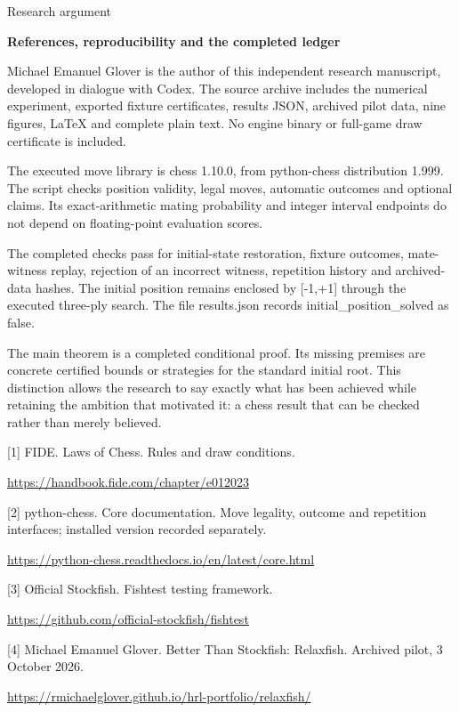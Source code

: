 \documentclass[10pt]{article}
\begin{document}
\clearpage
{\small\color{accent}Research argument}\par
{\LARGE\bfseries\color{ink}References, reproducibility and the completed ledger}\par\vspace{7pt}
Michael Emanuel Glover is the author of this independent research manuscript, developed in dialogue with Codex. The source archive includes the numerical experiment, exported fixture certificates, results JSON, archived pilot data, nine figures, LaTeX and complete plain text. No engine binary or full-game draw certificate is included.\par
The executed move library is chess 1.10.0, from python-chess distribution 1.999. The script checks position validity, legal moves, automatic outcomes and optional claims. Its exact-arithmetic mating probability and integer interval endpoints do not depend on floating-point evaluation scores.\par
The completed checks pass for initial-state restoration, fixture outcomes, mate-witness replay, rejection of an incorrect witness, repetition history and archived-data hashes. The initial position remains enclosed by [-1,+1] through the executed three-ply search. The file results.json records initial\_position\_solved as false.\par
The main theorem is a completed conditional proof. Its missing premises are concrete certified bounds or strategies for the standard initial root. This distinction allows the research to say exactly what has been achieved while retaining the ambition that motivated it: a chess result that can be checked rather than merely believed.\par
{\small [1] FIDE. Laws of Chess. Rules and draw conditions.\par\url{https://handbook.fide.com/chapter/e012023}\par}
{\small [2] python-chess. Core documentation. Move legality, outcome and repetition interfaces; installed version recorded separately.\par\url{https://python-chess.readthedocs.io/en/latest/core.html}\par}
{\small [3] Official Stockfish. Fishtest testing framework.\par\url{https://github.com/official-stockfish/fishtest}\par}
{\small [4] Michael Emanuel Glover. Better Than Stockfish: Relaxfish. Archived pilot, 3 October 2026.\par\url{https://rmichaelglover.github.io/hrl-portfolio/relaxfish/}\par}
\end{document}
